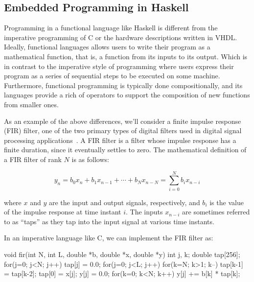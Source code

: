 \subsection{Embedded Programming in Haskell}
\label{haskell}

Programming in a functional language like Haskell is different from the imperative programming of C or the hardware descriptions written in VHDL. Ideally, functional languages allows users to write their program as a mathematical function, that is, a function from its inputs to its output. Which is in contrast to the imperative style of programming where users express their program as a series of sequential steps to be executed on some machine. Furthermore, functional programming is typically done compositionally, and its languages provide a rich of operators to support the composition of new functions from smaller ones.

As an example of the above differences, we'll consider a finite impulse response (FIR) filter, one of the two primary types of digital filters used in digital signal processing applications~\cite{oppenheim1989}. A FIR filter is a filter whose impulse response has a finite duration, since it eventually settles to zero. The mathematical definition of a FIR filter of rank $N$ is as follows:


\vspace{-2mm}
\begin{equation}
y_{n} = b_{0} x_{n} + b_{1} x_{n-1} + \cdots + b_{N} x_{n-N} = \sum_{i=0}^{N} b_{i} x_{n-i}
\end{equation}
\vspace{1mm}

\noindent where $x$ and $y$ are the input and output signals, respectively, and $b_i$ is the value of the impulse response at time instant $i$. The inputs $x_{n-i}$ are sometimes referred to as ``taps'' as they tap into the input signal at various time instants. 

In an imperative language like C, we can implement the FIR filter as:

\begin{code}
void fir(int N, int L, double *b, double *x, double *y)
{
 int j, k;
 double tap[256];
 for(j=0; j<N; j++) tap[j] = 0.0;
 for(j=0; j<L; j++)
 {
  for(k=N; k>1; k--) tap[k-1] = tap[k-2];
  tap[0] = x[j];
  y[j] = 0.0;
  for(k=0; k<N; k++) y[j] += b[k] * tap[k];
 }
}
\end{code}

